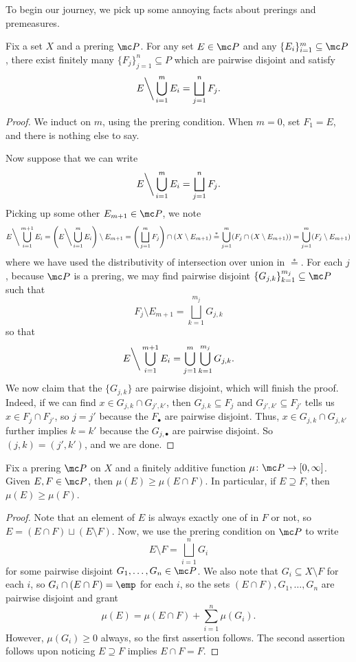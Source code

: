 \documentclass[../notes.tex]{subfiles}
\begin{document}
To begin our journey, we pick up some annoying facts about prerings and premeasures.
\begin{lemma} \label{lem:inductive-prering-subtract}
	Fix a set $X$ and a prering $\mc P$. For any set $E\in\mc P$ and any $\{E_i\}_{i=1}^m\subseteq\mc P$, there exist finitely many $\{F_j\}_{j=1}^n\subseteq P$ which are pairwise disjoint and satisfy
	\[E{\mathbin\bigg\backslash}\bigcup_{i=1}^mE_i=\bigsqcup_{j=1}^nF_j.\]
\end{lemma}
\begin{proof}
	We induct on $m$, using the prering condition. When $m=0$, set $F_1=E$, and there is nothing else to say.

	Now suppose that we can write
	\[E{\mathbin\bigg\backslash}\bigcup_{i=1}^mE_i=\bigsqcup_{j=1}^nF_j.\]
	Picking up some other $E_{m+1}\in\mc P$, we note
	\[E{\mathbin\bigg\backslash}\bigcup_{i=1}^{m+1}E_i=\Bigg(E{\mathbin\bigg\backslash}\bigcup_{i=1}^mE_i\Bigg)\setminus E_{m+1}=\Bigg(\bigsqcup_{j=1}^mF_j\Bigg)\cap(X\setminus E_{m+1})\stackrel*=\bigcup_{j=1}^m(F_j\cap(X\setminus E_{m+1}))=\bigcup_{j=1}^m(F_j\setminus E_{m+1})\]
	where we have used the distributivity of intersection over union in $\stackrel*=$. For each $j$, because $\mc P$ is a prering, we may find pairwise disjoint $\{G_{j,k}\}_{k=1}^{m_j}\subseteq\mc P$ such that
	\[F_j\setminus E_{m+1}=\bigsqcup_{k=1}^{m_j}G_{j,k}\]
	so that
	\[E{\mathbin\bigg\backslash}\bigcup_{i=1}^{m+1}E_i=\bigcup_{j=1}^m\bigcup_{k=1}^{m_j}G_{j,k}.\]
	We now claim that the $\{G_{j,k}\}$ are pairwise disjoint, which will finish the proof. Indeed, if we can find $x\in G_{j,k}\cap G_{j',k'}$, then $G_{j,k}\subseteq F_j$ and $G_{j',k'}\subseteq F_{j'}$ tells us $x\in F_j\cap F_{j'}$, so $j=j'$ because the $F_\bullet$ are pairwise disjoint. Thus, $x\in G_{j,k}\cap G_{j,k'}$ further implies $k=k'$ because the $G_{j,\bullet}$ are pairwise disjoint. So $(j,k)=(j',k')$, and we are done.
\end{proof}
\begin{lemma} \label{lem:fin-additive-is-monotone}
	Fix a prering $\mc P$ on $X$ and a finitely additive function $\mu\colon\mc P\to[0,\infty]$. Given $E,F\in\mc P$, then $\mu(E)\ge\mu(E\cap F)$. In particular, if $E\supseteq F$, then $\mu(E)\ge\mu(F)$.
\end{lemma}
\begin{proof}
	Note that an element of $E$ is always exactly one of in $F$ or not, so $E=(E\cap F)\sqcup(E\setminus F)$. Now, we use the prering condition on $\mc P$ to write
	\[E\setminus F=\bigsqcup_{i=1}^nG_i\]
	for some pairwise disjoint $G_1,\ldots,G_n\in\mc P$. We also note that $G_i\subseteq X\setminus F$ for each $i$, so $G_i\cap(E\cap F)=\emp$ for each $i$, so the sets $(E\cap F),G_1,\ldots,G_n$ are pairwise disjoint and grant
	\[\mu(E)=\mu(E\cap F)+\sum_{i=1}^n\mu(G_i).\]
	However, $\mu(G_i)\ge0$ always, so the first assertion follows. The second assertion follows upon noticing $E\supseteq F$ implies $E\cap F=F$.
\end{proof}
\end{document}
